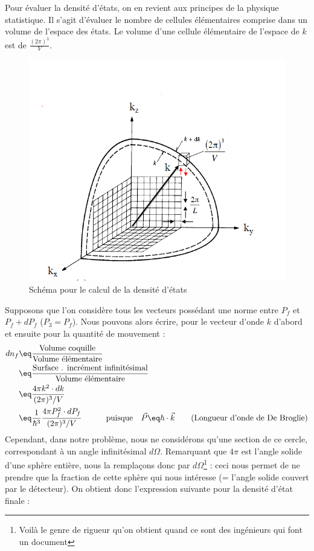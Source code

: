 Pour évaluer la densité d'états, on en revient aux principes de la physique statistique. Il s'agit d'évaluer le nombre de cellules élémentaires comprise dans un volume de l'espace des états. Le volume d'une cellule élémentaire de l'espace de $k$ est de $\frac{(2\pi)^3}{V}$.
 \begin{figure}[H]
    \centering
    \includegraphics[scale=0.80]{Images4/dens.PNG}
    \caption{Schéma pour le calcul de la densité d'états}
    \label{fig:Densité d'états}
\end{figure}
Supposons que l'on considère tous les vecteurs possédant une norme entre $P_f$ et $P_f + dP_f$ ($P_3 = P_f$). Nous pouvons alors écrire, pour le vecteur d'onde $k$ d'abord et ensuite pour la quantité de mouvement :
\begin{align*}
    dn_f 
        &\eq 
    \dfrac{\text{Volume coquille}}{\text{Volume élémentaire}}\\
        &\eq
    \dfrac{\text{Surface . incrément infinitésimal}}{\text{Volume élémentaire}}\\
        &\eq
    \dfrac{4\pi k^2 \cdot dk}{(2\pi)^3 / V}\\
        &\eq
    \frac{1}{\hbar^3}\frac{4\pi P^{2}_f \cdot dP_f}{(2\pi)^3 / V} 
    \qquad \quad \text{puisque} \quad
    \vec{P} \eq \hbar \cdot \vec{k} \qquad \text{(Longueur d'onde de De Broglie)}
\end{align*}
Cependant, dans notre problème, nous ne considérons qu'une section de ce cercle, correspondant à un angle infinitésimal $d\Omega$. Remarquant que $4\pi$ est l'angle solide d'une sphère entière, nous la remplaçons donc par $d\Omega$\footnote{Voilà le genre de rigueur qu'on obtient quand ce sont des ingénieurs qui font un document} : ceci nous permet de ne prendre que la fraction de cette sphère qui nous intéresse (= l'angle solide couvert par le détecteur). On obtient donc l'expression suivante pour la densité d'état finale : 
